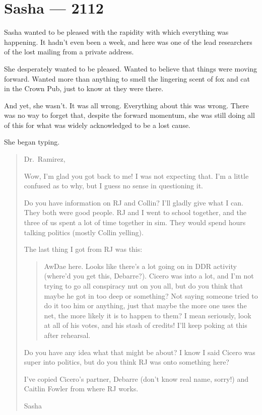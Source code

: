 \hypertarget{sasha-2112}{%
\chapter*{Sasha — 2112}\label{sasha-2112}}

Sasha wanted to be pleased with the rapidity with which everything was happening. It hadn't even been a week, and here was one of the lead researchers of the lost mailing from a private address.

She desperately wanted to be pleased. Wanted to believe that things were moving forward. Wanted more than anything to smell the lingering scent of fox and cat in the Crown Pub, just to know at they were there.

And yet, she wasn't. It was all wrong. Everything about this was wrong. There was no way to forget that, despite the forward momentum, she was still doing all of this for what was widely acknowledged to be a lost cause.

She began typing.

\begin{quote}
Dr.~Ramirez,

Wow, I'm glad you got back to me! I was not expecting that. I'm a little confused as to why, but I guess no sense in questioning it.

Do you have information on RJ and Collin? I'll gladly give what I can. They both were good people. RJ and I went to school together, and the three of us spent a lot of time together in sim. They would spend hours talking politics (mostly Collin yelling).

The last thing I got from RJ was this:

\begin{quote}
AwDae here. Looks like there's a lot going on in DDR activity (where'd you get this, Debarre?). Cicero was into a lot, and I'm not trying to go all conspiracy nut on you all, but do you think that maybe he got in too deep or something? Not saying someone tried to do it too him or anything, just that maybe the more one uses the net, the more likely it is to happen to them? I mean seriously, look at all of his votes, and his stash of credits! I'll keep poking at this after rehearsal.
\end{quote}

Do you have any idea what that might be about? I know I said Cicero was super into politics, but do you think RJ was onto something here?

I've copied Cicero's partner, Debarre (don't know real name, sorry!) and Caitlin Fowler from where RJ works.

Sasha
\end{quote}

